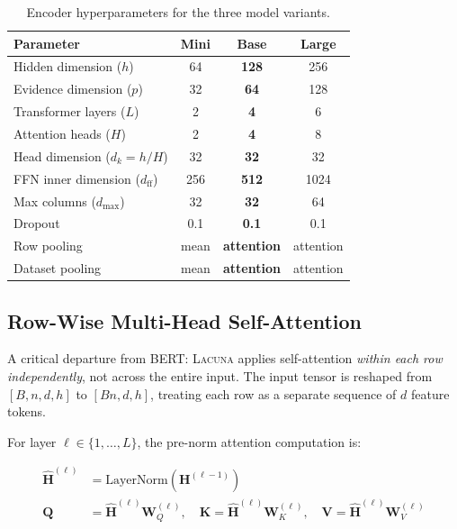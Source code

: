 \documentclass[11pt]{article}
\newcommand{\layernorm}{\text{LayerNorm}}
\newcommand{\lacuna}{\textsc{Lacuna}}
\begin{document}
\begin{table}[h]
\centering
\caption{Encoder hyperparameters for the three model variants.}
\label{tab:encoder_config}
\begin{tabular}{lccc}
\toprule
\textbf{Parameter} & \textbf{Mini} & \textbf{Base} & \textbf{Large} \\
\midrule
Hidden dimension ($h$) & 64 & \textbf{128} & 256 \\
Evidence dimension ($p$) & 32 & \textbf{64} & 128 \\
Transformer layers ($L$) & 2 & \textbf{4} & 6 \\
Attention heads ($H$) & 2 & \textbf{4} & 8 \\
Head dimension ($d_k = h/H$) & 32 & \textbf{32} & 32 \\
FFN inner dimension ($d_{\text{ff}}$) & 256 & \textbf{512} & 1024 \\
Max columns ($d_{\max}$) & 32 & \textbf{32} & 64 \\
Dropout & 0.1 & \textbf{0.1} & 0.1 \\
Row pooling & mean & \textbf{attention} & attention \\
Dataset pooling & mean & \textbf{attention} & attention \\
\bottomrule
\end{tabular}
\end{table}

\subsection{Row-Wise Multi-Head Self-Attention}

A critical departure from BERT: \lacuna{} applies self-attention \emph{within each row independently}, not across the entire input. The input tensor is reshaped from $[B, n, d, h]$ to $[Bn, d, h]$, treating each row as a separate sequence of $d$ feature tokens.

For layer $\ell \in \{1, \ldots, L\}$, the pre-norm attention computation is:

\begin{align}
\hat{\mathbf{H}}^{(\ell)} &= \layernorm\!\left(\mathbf{H}^{(\ell-1)}\right) \label{eq:prenorm_attn} \\
\mathbf{Q} &= \hat{\mathbf{H}}^{(\ell)} \mathbf{W}_Q^{(\ell)}, \quad
\mathbf{K} = \hat{\mathbf{H}}^{(\ell)} \mathbf{W}_K^{(\ell)}, \quad
\mathbf{V} = \hat{\mathbf{H}}^{(\ell)} \mathbf{W}_V^{(\ell)} \label{eq:qkv}
\end{align}
\end{document}

